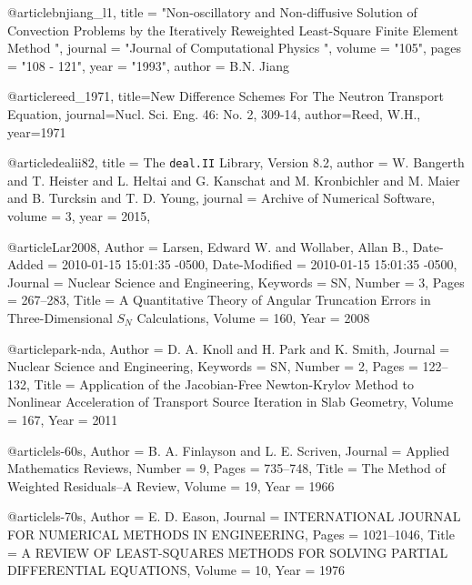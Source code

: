 @article{bnjiang_l1,
	title = "Non-oscillatory and Non-diffusive Solution of Convection Problems by the Iteratively Reweighted  Least-Square Finite Element Method ",
	journal = "Journal of Computational Physics ",
	volume = "105",
	pages = "108 - 121",
	year = "1993",
	author = {B.N. Jiang}
}

@article{reed_1971, 
	title={New Difference Schemes For The Neutron Transport Equation}, 
	journal={Nucl. Sci. Eng. 46:  No. 2, 309-14}, author={Reed, W.H.}, year={1971}}

@article{dealii82,
	title = {The \texttt{deal.II} Library, Version 8.2},
	author = {W. Bangerth and T. Heister and L. Heltai
	and G. Kanschat and M. Kronbichler
	and M. Maier and B. Turcksin
	and T. D. Young},
	journal = {Archive of Numerical Software},
	volume = 3,
	year = {2015},
}








@article{Lar2008,
	Author = {Larsen, Edward W. and Wollaber, Allan B.},
	Date-Added = {2010-01-15 15:01:35 -0500},
	Date-Modified = {2010-01-15 15:01:35 -0500},
	Journal = {Nuclear Science and Engineering},
	Keywords = {SN},
	Number = {3},
	Pages = {267--283},
	Title = {A Quantitative Theory of Angular Truncation Errors in Three-Dimensional {$S_N$} Calculations},
	Volume = {160},
	Year = {2008}}

@article{park-nda,
	Author = {D. A. Knoll and H. Park and K. Smith},
	Journal = {Nuclear Science and Engineering},
	Keywords = {SN},
	Number = {2},
	Pages = {122--132},
	Title = {Application of the Jacobian-Free Newton-Krylov Method to Nonlinear Acceleration of Transport Source Iteration in Slab Geometry},
	Volume = {167},
	Year = {2011}}

@article{ls-60s,
	Author = {B. A. Finlayson and L. E. Scriven},
	Journal = {Applied Mathematics Reviews},
	Number = {9},
	Pages = {735--748},
	Title = {The Method of Weighted Residuals--A Review},
	Volume = {19},
	Year = {1966}}

@article{ls-70s,
	Author = {E. D. Eason},
	Journal = {INTERNATIONAL JOURNAL FOR NUMERICAL METHODS IN ENGINEERING},
	Pages = {1021--1046},
	Title = {A REVIEW OF LEAST-SQUARES METHODS FOR SOLVING PARTIAL DIFFERENTIAL EQUATIONS},
	Volume = {10},
	Year = {1976}}

